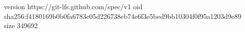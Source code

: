 version https://git-lfs.github.com/spec/v1
oid sha256:f4180169b0b0fa6783e05d226738eb74e6f3e5bed9bb10304f0f95a1203d9e89
size 349692
